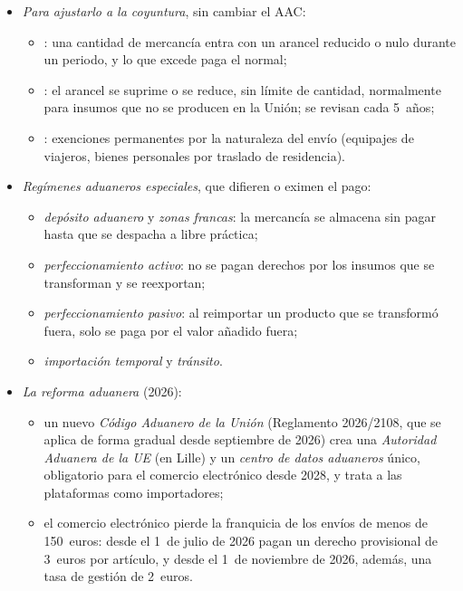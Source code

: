 \documentclass[11pt]{article}
\begin{document}
\begin{itemize}
\item \emph{Para ajustarlo a la coyuntura}, sin cambiar el AAC:
  \begin{itemize}
  \item {}: una cantidad de mercancía entra con un arancel reducido o nulo durante un periodo, y lo que excede paga el normal;
  \item {}: el arancel se suprime o se reduce, sin límite de cantidad, normalmente para insumos que no se producen en la Unión; se revisan cada 5~años;
  \item {}: exenciones permanentes por la naturaleza del envío (equipajes de viajeros, bienes personales por traslado de residencia).
  \end{itemize}
\item \emph{Regímenes aduaneros especiales}, que difieren o eximen el pago:
  \begin{itemize}
  \item \emph{depósito aduanero} y \emph{zonas francas}: la mercancía se almacena sin pagar hasta que se despacha a libre práctica;
  \item \emph{perfeccionamiento activo}: no se pagan derechos por los insumos que se transforman y se reexportan;
  \item \emph{perfeccionamiento pasivo}: al reimportar un producto que se transformó fuera, solo se paga por el valor añadido fuera;
  \item \emph{importación temporal} y \emph{tránsito}.
  \end{itemize}
\item \emph{La reforma aduanera} (2026)\nocite{CE2026ReformaAduanera}:
  \begin{itemize}
  \item un nuevo \emph{Código Aduanero de la Unión} (Reglamento 2026/2108, que se aplica de forma gradual desde septiembre de 2026) crea una \emph{Autoridad Aduanera de la UE} (en Lille) y un \emph{centro de datos aduaneros} único, obligatorio para el comercio electrónico desde 2028, y trata a las plataformas como importadores;
  \item el comercio electrónico pierde la franquicia de los envíos de menos de 150~euros: desde el 1~de julio de 2026 pagan un derecho provisional de 3~euros por artículo, y desde el 1~de noviembre de 2026, además, una tasa de gestión de 2~euros\nocite{UE2026EnviosBajoValor}.
  \end{itemize}
\end{itemize}
\end{document}
